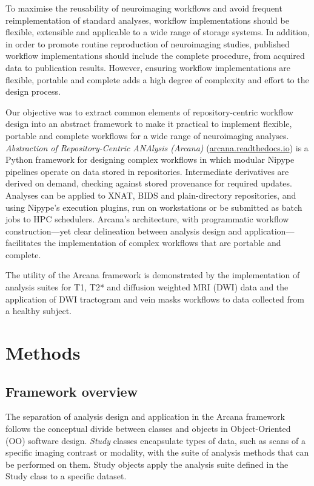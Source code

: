 \documentclass[smallextended]{svjour3}       %
\begin{document}
To maximise the reusability of neuroimaging workflows and avoid frequent
reimplementation of standard analyses, workflow implementations should
be flexible, extensible and applicable to a wide range of storage
systems. In addition, in order to promote routine reproduction of
neuroimaging studies, published workflow implementations should include
the complete procedure, from acquired data to publication results.
However, ensuring workflow implementations are flexible, portable and
complete adds a high degree of complexity and effort to the design
process.

Our objective was to extract common elements of repository-centric
workflow design into an abstract framework to make it practical to
implement flexible, portable and complete workflows for a wide range of
neuroimaging analyses. \emph{Abstraction of Repository-Centric ANAlysis
(Arcana)} (\url{arcana.readthedocs.io}) is a Python framework for
designing complex workflows in which modular Nipype pipelines operate on
data stored in repositories. Intermediate derivatives are
derived on demand, checking against stored provenance for required
updates. Analyses can be applied to XNAT, BIDS and plain-directory
repositories, and using Nipype's execution plugins, run on workstations
or be submitted as batch jobs to HPC schedulers. Arcana's architecture,
with programmatic workflow construction---yet clear delineation between
analysis design and application---facilitates the implementation of
complex workflows that are portable and complete.


The utility of the Arcana framework is demonstrated by the
implementation of analysis suites for T1, T2* and diffusion weighted MRI
(DWI) data and the application of DWI tractogram \citep{tournier_mrtrix:_2012} and
vein masks \citep{ward_vein_2017} workflows to data collected from a
healthy subject.

\section*{Methods}
\label{methods}

\subsection*{Framework overview}
\label{framework-overview}

The separation of analysis design and application in the Arcana
framework follows the conceptual divide between classes and objects in
Object-Oriented (OO) software design. \emph{Study} classes encapsulate
types of data, such as scans of a specific imaging
contrast or modality, with the suite of analysis methods that can be performed on
them. Study objects apply the analysis suite defined in
the Study class to a specific dataset.
\end{document}
